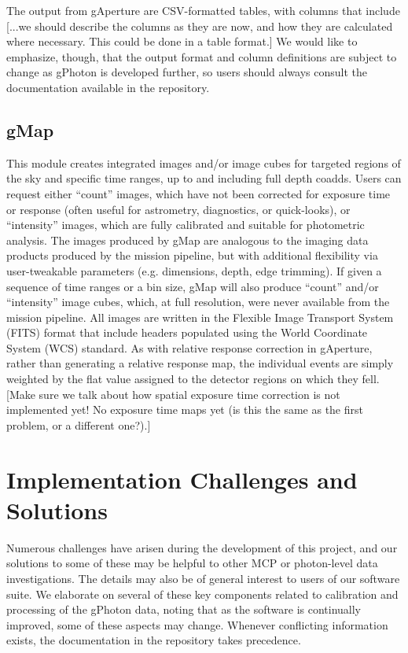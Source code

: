 \documentclass[5p]{elsarticle}
\begin{document}
The output from gAperture are CSV-formatted tables, with columns that include {\color{red}[...we should describe the columns as they are now, and how they are calculated where necessary.  This could be done in a table format.]}  We would like to emphasize, though, that the output format and column definitions are subject to change as gPhoton is developed further, so users should always consult the documentation available in the repository.

\subsection{gMap}
This module creates integrated images and/or image cubes for targeted regions of the sky and specific time ranges, up to and including full depth coadds. Users can request either ``count'' images, which have not been corrected for exposure time or response (often useful for astrometry, diagnostics, or quick-looks), or ``intensity'' images, which are fully calibrated and suitable for photometric analysis. The images produced by gMap are analogous to the imaging data products produced by the mission pipeline, but with additional flexibility via user-tweakable parameters (e.g. dimensions, depth, edge trimming). If given a sequence of time ranges or a bin size, gMap will also produce ``count'' and/or ``intensity'' image cubes, which, at full resolution, were never available from the mission pipeline. All images are written in the Flexible Image Transport System (FITS) format that include headers populated using the World Coordinate System (WCS) standard.  As with relative response correction in gAperture, rather than generating a relative response map, the individual events are simply weighted by the flat value assigned to the detector regions on which they fell. {\color{red}[Make sure we talk about how spatial exposure time correction is not implemented yet!  No exposure time maps yet (is this the same as the first problem, or a different one?).]}

\section{Implementation Challenges and Solutions}
\label{implementation}
Numerous challenges have arisen during the development of this project, and our solutions to some of these may be helpful to other MCP or photon-level data investigations. The details may also be of general interest to users of our software suite.  We elaborate on several of these key components related to calibration and processing of the gPhoton data, noting that as the software is continually improved, some of these aspects may change.  Whenever conflicting information exists, the documentation in the repository takes precedence.
\end{document}
